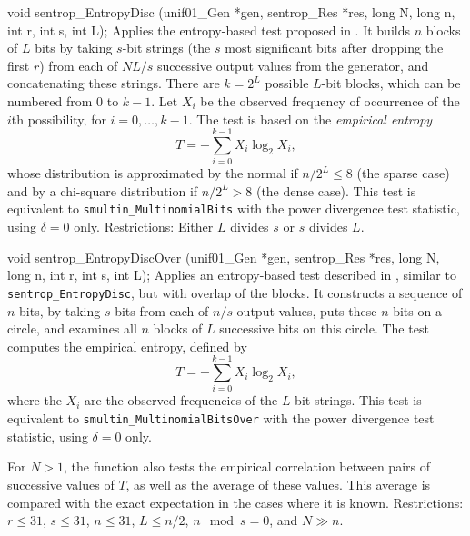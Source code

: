 void sentrop_EntropyDisc (unif01_Gen *gen, sentrop_Res *res,
                          long N, long n, int r, int s, int L);
\endcode
\tab
  Applies the entropy-based test
   proposed in \cite{rLEC96e}.
  It builds $n$ blocks of $L$ bits by taking $s$-bit strings 
  (the $s$ most significant bits after dropping the first $r$) from each of
  $NL/s$ successive output values from the generator, and concatenating
  these strings.
  There are $k=2^L$ possible $L$-bit blocks, which can be numbered 
  from 0 to $k-1$.  Let $X_i$ be the observed frequency of occurrence
  of the $i$th possibility, for $i=0,\dots,k-1$.
  The test is based on the {\em empirical entropy\/}
   $$ T = -\sum_{i = 0}^{k-1} X_i \log_2 X_i, $$
  whose distribution is approximated by the normal if $n/2^L \le 8$
  (the sparse case) and by a chi-square distribution if $n/2^L > 8$
  (the dense case).
  This test is equivalent to {\tt smultin\_Multino\-mial\-Bits} with the
  power divergence test statistic, using $\delta=0$ only.
\iffalse  %
  If $s$ divides $L$, it is equivalent to calling
  {\tt smultin\_Multinomial} with $d=2^s$, $t= L/s$, and
  looking at the result for $\delta=0$.  
\fi  %
  Restrictions: Either $L$ divides $s$ or $s$ divides $L$.
\endtab
\code


void sentrop_EntropyDiscOver (unif01_Gen *gen, sentrop_Res *res,
                              long N, long n, int r, int s, int L);
\endcode
\tab
  Applies an entropy-based test
  described in \cite{rLEC96e}, similar
  to {\tt sentrop\_EntropyDisc}, but with overlap of the blocks.
  It constructs a sequence of $n$ bits, by taking $s$ bits from each 
  of $n/s$ output values, puts these $n$ bits on a circle,
  and examines all $n$ blocks of $L$ successive bits on this circle.
  The test computes the empirical entropy, defined by
   $$ T = -\sum_{i = 0}^{k-1} X_i \log_2 X_i, $$
  where the $X_i$ are the observed frequencies of the $L$-bit strings.
  This test is equivalent to {\tt smultin\_MultinomialBitsOver} with the
  power divergence test statistic, using $\delta=0$ only.

  For $N>1$, the function also tests the empirical correlation 
  between pairs of successive values of $T$, as well as the average
  of these values.  This average is compared with the exact expectation
  in the cases where it is known.
  Restrictions:  $r\le 31$, $s\le 31$, $n\le 31$, $L \le n/2$,
  $n \mod s = 0$, and $N \gg n$. 
\endtab
\code


